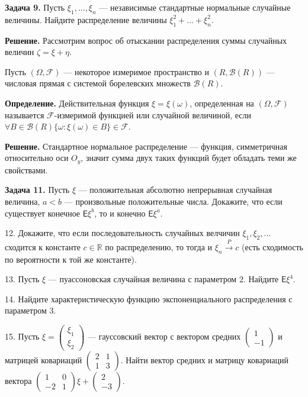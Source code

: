 \documentclass{article}
\begin{document}
\textbf{Задача 9.} 
Пусть $\xi_1,...,\xi_n$ --- независимые стандартные нормальные случайные величины. Найдите распределение величины $\xi_1^2+...+\xi_n^2$.

\textbf{Решение.}
Рассмотрим вопрос об отыскании распределения суммы случайных величин $\zeta=\xi+\eta$.

Пусть 
$(\Omega, \mathscr F)$ 
--- некоторое измеримое пространство и 
$(R, \mathscr B(R))$ 
--- числовая прямая с системой борелевских множеств $\mathscr B(R)$.

\textbf{Определение.} 
Действительная функция $\xi=\xi(\omega)$, определенная на $(\Omega, \mathscr F)$ называется $\mathscr F$-измеримой функцией или случайной величиной, если 
$\forall B\in\mathscr B(R) \{\omega: \xi(\omega)\in B\}\in\mathscr F$.

\textbf{Решение.}
Стандартное нормальное распределение --- функция, симметричная относительно оси $O_y$, значит сумма двух таких функций будет обладать теми же свойствами.

\textbf{Задача 11.}
Пусть $\xi$ --- положительная абсолютно непрерывная случайная величина, $a<b$ --- произвольные положительные числа. Докажите, что если существует конечное $\mathsf{E}\xi^b$, то и конечно $\mathsf{E}\xi^a$.


12. Докажите, что если последовательность случайных велчичин $\xi_1, \xi_2, ...$ сходится к константе $c\in\mathbb{R}$ по распределению, то тогда и $\xi_n\xrightarrow{P}c$ (есть сходимость по вероятности к той же константе).

13. Пусть $\xi$ --- пуассоновская случайная величина с параметром $2$. Найдите $\mathsf{E}\xi^4$. 

14. Найдите характеристическую функцию экспоненциального распределения с параметром 3.

15. 
Пусть 
$\xi = \begin{pmatrix}\xi_1\\\xi_2\end{pmatrix}$
	--- гауссовский вектор с вектором средних 
	$\begin{pmatrix}1\\-1\end{pmatrix}$
		и матрицей ковариаций 
		$\begin{pmatrix}2&1\\1&3\end{pmatrix}$. 
Найти вектор средних и матрицу ковариаций вектора 
$\begin{pmatrix}1&0\\-2&1\end{pmatrix}\xi+\begin{pmatrix}2\\-3\end{pmatrix}$.



		
\end{document}
